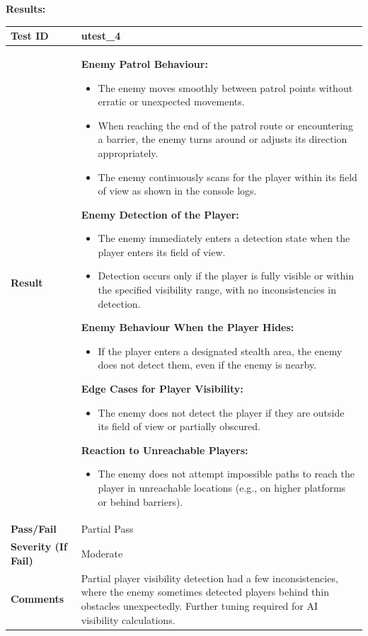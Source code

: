 \documentclass[11pt, a4paper]{article}
\begin{document}
\newpage

\noindent \textbf{Results:}

\begin{center}
\begin{tabularx}{\linewidth}{|>{\raggedright\arraybackslash}m{4cm}|X|}
    \hline
    \textbf{Test ID} & utest\_4 \\
    \hline
    \textbf{Result} &
    \textbf{Enemy Patrol Behaviour:}
    \begin{itemize}
        \item The enemy moves smoothly between patrol points without erratic or unexpected movements.
        \item When reaching the end of the patrol route or encountering a barrier, the enemy turns around or adjusts its direction appropriately.
        \item The enemy continuously scans for the player within its field of view as shown in the console logs.
    \end{itemize}
    \textbf{Enemy Detection of the Player:}
    \begin{itemize}
        \item The enemy immediately enters a detection state when the player enters its field of view.
        \item Detection occurs only if the player is fully visible or within the specified visibility range, with no inconsistencies in detection.
    \end{itemize}
    \textbf{Enemy Behaviour When the Player Hides:}
    \begin{itemize}
        \item If the player enters a designated stealth area, the enemy does not detect them, even if the enemy is nearby.
    \end{itemize}
    \textbf{Edge Cases for Player Visibility:}
    \begin{itemize}
        \item The enemy does not detect the player if they are outside its field of view or partially obscured.
    \end{itemize}
    \textbf{Reaction to Unreachable Players:}
    \begin{itemize}
        \item The enemy does not attempt impossible paths to reach the player in unreachable locations (e.g., on higher platforms or behind barriers).
    \end{itemize}
    \\
    \hline
    \textbf{Pass/Fail} & Partial Pass \\
    \hline
    \textbf{Severity (If Fail)} & Moderate \\
    \hline
    \textbf{Comments} & Partial player visibility detection had a few inconsistencies, where the enemy sometimes detected players behind thin obstacles unexpectedly. Further tuning required for AI visibility calculations. \\
    \hline
\end{tabularx}
\end{center}
\end{document}
